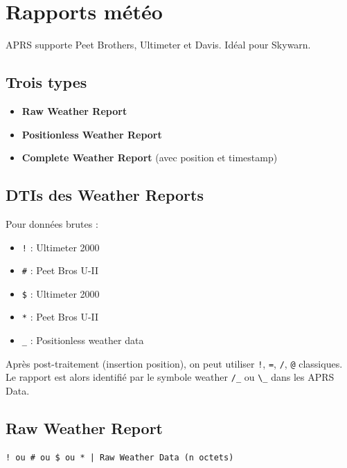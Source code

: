 \chapter[RAPPORTS MÉTÉO]{Rapports météo}\label{rapports-muxe9tuxe9o}

APRS supporte Peet Brothers, Ultimeter et Davis. Idéal pour Skywarn.

\section{Trois types}\label{trois-types}

\begin{itemize}
\tightlist
\item
  \textbf{Raw Weather Report}
\item
  \textbf{Positionless Weather Report}
\item
  \textbf{Complete Weather Report} (avec position et timestamp)
\end{itemize}

\section{DTIs des Weather Reports}\label{dtis-des-weather-reports}

Pour données brutes :

\begin{itemize}
\tightlist
\item
  \texttt{!} : Ultimeter 2000
\item
  \texttt{\#} : Peet Bros U-II
\item
  \texttt{\$} : Ultimeter 2000
\item
  \texttt{*} : Peet Bros U-II
\item
  \texttt{\_} : Positionless weather data
\end{itemize}

Après post-traitement (insertion position), on peut utiliser \texttt{!},
\texttt{=}, \texttt{/}, \texttt{@} classiques. Le rapport est alors
identifié par le symbole weather \texttt{/\_} ou
\texttt{\textbackslash{}\_} dans les APRS Data.

\section{Raw Weather Report}\label{raw-weather-report}

\begin{verbatim}
! ou # ou $ ou * | Raw Weather Data (n octets)
\end{verbatim}

